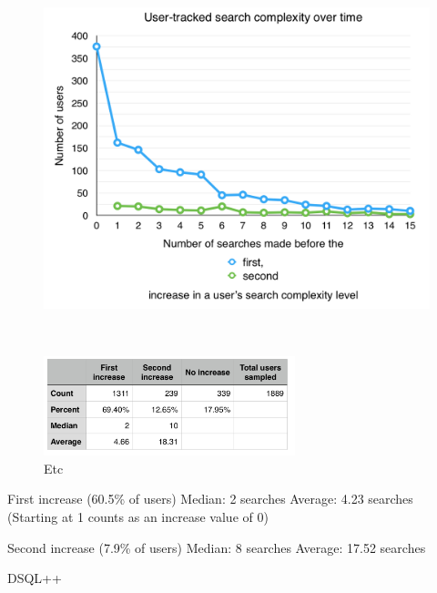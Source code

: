 \begin{figure}
  \centering

  \includegraphics[width=1.00\textwidth]{images/graph/search_dt}

  \\
  \vspace{5pt}

  \includegraphics[width=0.65\textwidth]{images/table/search_dt}

  \caption{Etc}
  \label{fig:searchtypes}
\end{figure}

First increase (60.5\% of users)
Median: 2 searches
Average: 4.23 searches
(Starting at 1 counts as an increase value of 0)

Second increase (7.9\% of users)
Median: 8 searches
Average: 17.52 searches

DSQL++